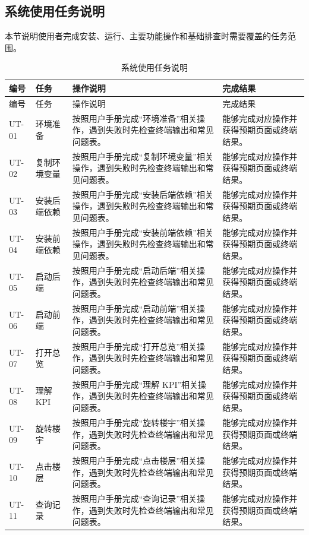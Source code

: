 \documentclass[12pt,a4paper]{ctexart}
\begin{document}
\subsection{系统使用任务说明}
本节说明使用者完成安装、运行、主要功能操作和基础排查时需要覆盖的任务范围。
\begin{longtable}{L{1.8cm}L{3.2cm}L{6.4cm}L{4.0cm}}
\caption{系统使用任务说明}\\
\toprule
编号 & 任务 & 操作说明 & 完成结果 \\
\midrule
\endfirsthead
\toprule
编号 & 任务 & 操作说明 & 完成结果 \\
\midrule
\endhead
UT-01 & 环境准备 & 按照用户手册完成“环境准备”相关操作，遇到失败时先检查终端输出和常见问题表。 & 能够完成对应操作并获得预期页面或终端结果。 \\
UT-02 & 复制环境变量 & 按照用户手册完成“复制环境变量”相关操作，遇到失败时先检查终端输出和常见问题表。 & 能够完成对应操作并获得预期页面或终端结果。 \\
UT-03 & 安装后端依赖 & 按照用户手册完成“安装后端依赖”相关操作，遇到失败时先检查终端输出和常见问题表。 & 能够完成对应操作并获得预期页面或终端结果。 \\
UT-04 & 安装前端依赖 & 按照用户手册完成“安装前端依赖”相关操作，遇到失败时先检查终端输出和常见问题表。 & 能够完成对应操作并获得预期页面或终端结果。 \\
UT-05 & 启动后端 & 按照用户手册完成“启动后端”相关操作，遇到失败时先检查终端输出和常见问题表。 & 能够完成对应操作并获得预期页面或终端结果。 \\
UT-06 & 启动前端 & 按照用户手册完成“启动前端”相关操作，遇到失败时先检查终端输出和常见问题表。 & 能够完成对应操作并获得预期页面或终端结果。 \\
UT-07 & 打开总览 & 按照用户手册完成“打开总览”相关操作，遇到失败时先检查终端输出和常见问题表。 & 能够完成对应操作并获得预期页面或终端结果。 \\
UT-08 & 理解 KPI & 按照用户手册完成“理解 KPI”相关操作，遇到失败时先检查终端输出和常见问题表。 & 能够完成对应操作并获得预期页面或终端结果。 \\
UT-09 & 旋转楼宇 & 按照用户手册完成“旋转楼宇”相关操作，遇到失败时先检查终端输出和常见问题表。 & 能够完成对应操作并获得预期页面或终端结果。 \\
UT-10 & 点击楼层 & 按照用户手册完成“点击楼层”相关操作，遇到失败时先检查终端输出和常见问题表。 & 能够完成对应操作并获得预期页面或终端结果。 \\
UT-11 & 查询记录 & 按照用户手册完成“查询记录”相关操作，遇到失败时先检查终端输出和常见问题表。 & 能够完成对应操作并获得预期页面或终端结果。 \\

\end{longtable}
\end{document}
